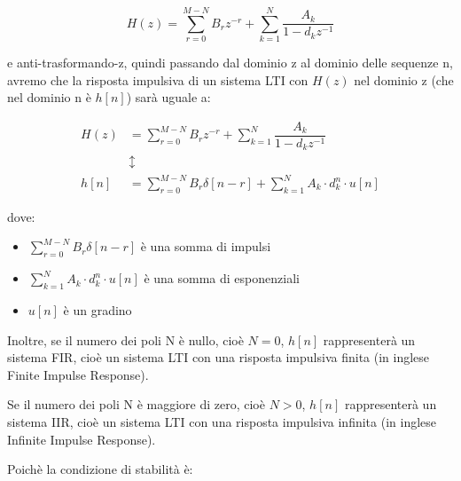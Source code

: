 {
    \Large 
    \begin{equation}
        H \left(z\right)
        = 
        \sum_{r = 0}^{M -N}
        B_r z^{-r}
        + 
        \sum_{k = 1}^{N}
        \dfrac{A_k}{1 - d_k z^{-1}}
    \end{equation}
}

e anti-trasformando-z, quindi passando dal dominio z al dominio delle sequenze n, avremo che 
la risposta impulsiva di un sistema LTI con $H \left(z\right)$ nel dominio z (che nel dominio n è $h \left[ n\right]$) sarà uguale a: 

{
    \Large 
    \begin{equation}
        \begin{split}
        H \left(z\right)
        &= 
        \sum_{r = 0}^{M -N}
        B_r z^{-r}
        + 
        \sum_{k = 1}^{N}
        \dfrac{A_k}{1 - d_k z^{-1}}
        \\
        &\updownarrow
        \\
        h \left[ n\right]
        &=
        \sum_{r = 0}^{M -N}
        B_r \delta \left[ n - r\right] 
        + 
        \sum_{k = 1}^{N}
        A_k \cdot d_k^{n} \cdot u \left[ n\right]
        \end{split}
    \end{equation}
}

dove: 

\begin{itemize}
    \item $\sum_{r = 0}^{M -N} B_r \delta \left[ n - r\right] $ è una somma di impulsi 
    \item $\sum_{k = 1}^{N} A_k \cdot d_k^{n} \cdot u \left[ n\right] $ è una somma di esponenziali 
    \item $u \left[ n\right]$ è un gradino
\end{itemize}

\label{nota: differenza tra FIR e IIR} 

Inoltre, se il numero dei poli N è nullo, cioè $N = 0$, $h \left[ n\right]$ rappresenterà un sistema FIR, cioè un sistema LTI con una risposta impulsiva finita (in inglese Finite Impulse Response). \newline 

Se il numero dei poli N è maggiore di zero, cioè $N > 0$, $h \left[ n\right]$ rappresenterà un sistema IIR, cioè un sistema LTI con una risposta impulsiva infinita (in inglese Infinite Impulse Response). \newline

Poichè la condizione di stabilità è: 

